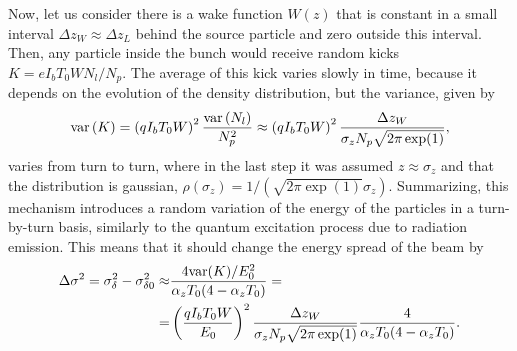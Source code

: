     Now, let us consider there is a wake function $W(z)$ that is constant in a small interval $\Delta z_W \approx \Delta z_L$ behind the source particle and zero outside this interval. Then, any particle inside the bunch would receive random kicks $K = eI_b T_0 W N_l/N_p$. The average of this kick varies slowly in time, because it depends on the evolution of the density distribution, but the variance, given by
    \begin{align}
        \text{var}\left(K\right) = \left(qI_b T_0 W\right)^2 \frac{\text{var}\left(N_l\right)}{N_p^2} \approx
        \left(qI_b T_0 W\right)^2 \frac{\Delta z_W}{\sigma_zN_p\sqrt{2\pi \exp(1)}},
    \end{align}
    varies from turn to turn, where in the last step it was assumed $z \approx \sigma_z$ and that the distribution is gaussian, $\rho(\sigma_z)=1/(\sqrt{2\pi \exp(1)}\sigma_z)$. Summarizing, this mechanism introduces a random variation of the energy of the particles in a turn-by-turn basis, similarly to the quantum excitation process due to radiation emission. This means that it should change the energy spread of the beam by
    \begin{align}\label{eq:energy_spread_variation}
        \Delta \sigma^2 = \sigma_\delta^2 - \sigma_{\delta0}^2 \approx&
        \frac{4\text{var}(K)/E_0^2}{\alpha_z T_0(4-\alpha_z T_0)} =\nonumber\\
        =&\left(\frac{qI_b T_0 W}{E_0}\right)^2 \frac{\Delta z_W}{\sigma_zN_p\sqrt{2\pi \exp(1)}} \frac{4}{\alpha_z T_0(4-\alpha_z T_0)}.
    \end{align}

